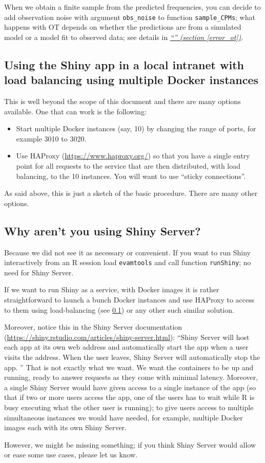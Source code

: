 \documentclass[a4paper,11pt]{article}
\newcommand*{\qref}[1]{\hyperref[{#1}]{\textit{``\nameref*{#1}'' (section \ref*{#1})}}}
\begin{document}
When we obtain a finite sample from the predicted frequencies, you can decide to add observation noise with argument \texttt{obs\_noise} to function \texttt{sample\_CPMs}; what happens with OT depends on whether the predictions are from a simulated model or a model fit to observed data; see details in \qref{error_ot}.


\subsection{Using the Shiny app in a local intranet with load balancing using multiple Docker instances}
\label{haproxy}

This is well beyond the scope of this document and there are many options available. One that can work is the following:
\begin{itemize}
\item Start multiple Docker instances (say, 10) by changing the range of ports, for example 3010 to 3020.
\item Use HAProxy (\url{https://www.haproxy.org/}) so that you have a single entry point for all requests to the service that are then distributed, with load balancing, to the 10 instances. You will want to use ``sticky connections''.
\end{itemize}

As said above, this is just a sketch of the basic procedure. There are many other options.


\subsection{Why aren't you using Shiny Server?}
\label{sec:why-arent-you}

Because we did not see it as necessary or convenient. If you want to run Shiny interactively from an R session load \texttt{evamtools} and call function \texttt{runShiny}; no need for Shiny Server.

If we want to run Shiny as a service, with Docker images it is rather straightforward to launch a bunch Docker instances and use HAProxy to access to them using load-balancing (see \ref{haproxy}) or any other such similar solution.

Moreover, notice this in the Shiny Server documentation (\url{https://shiny.rstudio.com/articles/shiny-server.html}): ``Shiny Server will host each app at its own web address and automatically start the app when a user visits the address. When the user leaves, Shiny Server will automatically stop the app. ''  That is not exactly what we want. We want the containers to be up and running, ready to answer requests as they come with minimal latency. Moreover, a single Shiny Server would have given access to a single instance of the app (so that if two or more users access the app, one of the users has to wait while R is busy executing what the other user is running); to give users access to multiple simultaneous instances we would have needed, for example, multiple Docker images each with its own Shiny Server.

However, we might be missing something; if you think Shiny Server would allow or ease some use cases, please let us know.




\end{document}

